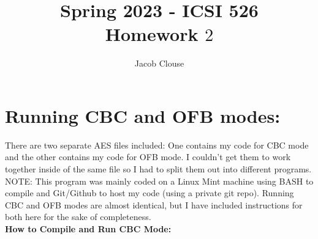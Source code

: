 \documentclass[10pt]{article}
\author{Jacob Clouse}
\title{Spring 2023 - ICSI 526\\Homework $2$}
\begin{document}
\maketitle

\section{Running CBC and OFB modes:}
\noindent There are two separate AES files included: One contains my code for CBC mode and the other contains my code for OFB mode. I couldn't get them to work together inside of the same file so I had to split them out into different programs. NOTE: This program was mainly coded on a Linux Mint machine using BASH to compile and Git/Github to host my code (using a private git repo). Running CBC and OFB modes are almost identical, but I have included instructions for both here for the sake of completeness. 
\vspace{0.2in}
\\
\noindent \textbf{How to Compile and Run CBC Mode: } 
\end{document}
